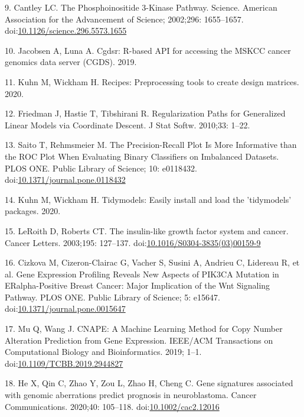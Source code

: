 \documentclass[10pt,letterpaper]{article}
\begin{document}
\leavevmode\hypertarget{ref-cantleyPhosphoinositide3KinasePathway2002}{}%
9. Cantley LC. The Phosphoinositide 3-Kinase Pathway. Science. American
Association for the Advancement of Science; 2002;296: 1655--1657.
doi:\href{https://doi.org/10.1126/science.296.5573.1655}{10.1126/science.296.5573.1655}

\leavevmode\hypertarget{ref-jacobsenCgdsrRbasedAPI2019}{}%
10. Jacobsen A, Luna A. Cgdsr: R-based API for accessing the MSKCC
cancer genomics data server (CGDS). 2019.

\leavevmode\hypertarget{ref-kuhnRecipesPreprocessingTools2020}{}%
11. Kuhn M, Wickham H. Recipes: Preprocessing tools to create design
matrices. 2020.

\leavevmode\hypertarget{ref-friedmanRegularizationPathsGeneralized2010}{}%
12. Friedman J, Hastie T, Tibshirani R. Regularization Paths for
Generalized Linear Models via Coordinate Descent. J Stat Softw. 2010;33:
1--22.

\leavevmode\hypertarget{ref-saitoPrecisionRecallPlotMore2015}{}%
13. Saito T, Rehmsmeier M. The Precision-Recall Plot Is More Informative
than the ROC Plot When Evaluating Binary Classifiers on Imbalanced
Datasets. PLOS ONE. Public Library of Science; 10: e0118432.
doi:\href{https://doi.org/10.1371/journal.pone.0118432}{10.1371/journal.pone.0118432}

\leavevmode\hypertarget{ref-kuhnTidymodelsEasilyInstall2020}{}%
14. Kuhn M, Wickham H. Tidymodels: Easily install and load the
'tidymodels' packages. 2020.

\leavevmode\hypertarget{ref-leroithInsulinlikeGrowthFactor2003}{}%
15. LeRoith D, Roberts CT. The insulin-like growth factor system and
cancer. Cancer Letters. 2003;195: 127--137.
doi:\href{https://doi.org/10.1016/S0304-3835(03)00159-9}{10.1016/S0304-3835(03)00159-9}

\leavevmode\hypertarget{ref-cizkovaGeneExpressionProfiling2010}{}%
16. Cizkova M, Cizeron-Clairac G, Vacher S, Susini A, Andrieu C,
Lidereau R, et al. Gene Expression Profiling Reveals New Aspects of
PIK3CA Mutation in ERalpha-Positive Breast Cancer: Major Implication of
the Wnt Signaling Pathway. PLOS ONE. Public Library of Science; 5:
e15647.
doi:\href{https://doi.org/10.1371/journal.pone.0015647}{10.1371/journal.pone.0015647}

\leavevmode\hypertarget{ref-muCNAPEMachineLearning2019}{}%
17. Mu Q, Wang J. CNAPE: A Machine Learning Method for Copy Number
Alteration Prediction from Gene Expression. IEEE/ACM Transactions on
Computational Biology and Bioinformatics. 2019; 1--1.
doi:\href{https://doi.org/10.1109/TCBB.2019.2944827}{10.1109/TCBB.2019.2944827}

\leavevmode\hypertarget{ref-heGeneSignaturesAssociated2020}{}%
18. He X, Qin C, Zhao Y, Zou L, Zhao H, Cheng C. Gene signatures
associated with genomic aberrations predict prognosis in neuroblastoma.
Cancer Communications. 2020;40: 105--118.
doi:\href{https://doi.org/10.1002/cac2.12016}{10.1002/cac2.12016}

\nolinenumbers
\end{document}
